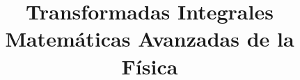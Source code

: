 
\newcommand{\saltosin}{\nonumber \\}
\title{Transformadas Integrales \\ {\large Matemáticas Avanzadas de la Física}}
\date{ }

\maketitle
\fontsize{14}{14}\selectfont
